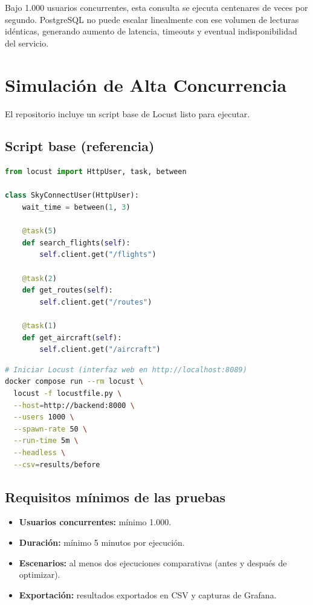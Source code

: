 \documentclass[12pt,a4paper]{article}
\begin{document}
\begin{infobox}
Bajo 1.000 usuarios concurrentes, esta consulta se ejecuta centenares de veces por segundo. PostgreSQL no puede escalar linealmente con ese volumen de lecturas idénticas, generando aumento de latencia, timeouts y eventual indisponibilidad del servicio.
\end{infobox}

\section{Simulación de Alta Concurrencia}

El repositorio incluye un script base de Locust listo para ejecutar.

\subsection{Script base (referencia)}

\begin{lstlisting}[language=python, caption={locust/locustfile.py --- script base entregado}]
from locust import HttpUser, task, between

class SkyConnectUser(HttpUser):
    wait_time = between(1, 3)

    @task(5)
    def search_flights(self):
        self.client.get("/flights")

    @task(2)
    def get_routes(self):
        self.client.get("/routes")

    @task(1)
    def get_aircraft(self):
        self.client.get("/aircraft")
\end{lstlisting}

\begin{lstlisting}[language=bash, caption={Ejecutar prueba de carga}]
# Iniciar Locust (interfaz web en http://localhost:8089)
docker compose run --rm locust \
  locust -f locustfile.py \
  --host=http://backend:8000 \
  --users 1000 \
  --spawn-rate 50 \
  --run-time 5m \
  --headless \
  --csv=results/before
\end{lstlisting}

\subsection{Requisitos mínimos de las pruebas}

\begin{itemize}
  \item \textbf{Usuarios concurrentes:} mínimo 1.000.
  \item \textbf{Duración:} mínimo 5 minutos por ejecución.
  \item \textbf{Escenarios:} al menos dos ejecuciones comparativas (antes y después de optimizar).
  \item \textbf{Exportación:} resultados exportados en CSV y capturas de Grafana.
\end{itemize}
\end{document}
